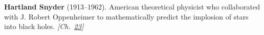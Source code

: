 \textbf{Hartland Snyder} (1913–1962). American theoretical physicist who collaborated with J. Robert Oppenheimer to mathematically predict the implosion of stars into black holes. \emph{[Ch.~\hyperref[ch:blackholetimedilationredshift]{23}]}


